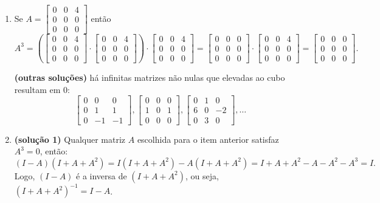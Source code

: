 \documentclass[12pt,a4paper]{article}
\begin{document}
\begin{ExerciseList}
\Answer
\begin{enumerate}
\item Se $A = \begin{bmatrix}
0 &0 &4\\
0 &0 &0\\
0 &0 &0
\end{bmatrix}$ então
\[
A^3 =\left(
\begin{bmatrix}
0 &0 &4\\
0 &0 &0\\
0 &0 &0
\end{bmatrix}
\cdot
\begin{bmatrix}
0 &0 &4\\
0 &0 &0\\
0 &0 &0
\end{bmatrix}\right)
\cdot
\begin{bmatrix}
0 &0 &4\\
0 &0 &0\\
0 &0 &0
\end{bmatrix}
=
\begin{bmatrix}
0 &0 &0\\
0 &0 &0\\
0 &0 &0
\end{bmatrix}
\cdot
\begin{bmatrix}
0 &0 &4\\
0 &0 &0\\
0 &0 &0
\end{bmatrix}
=
\begin{bmatrix}
0 &0 &0\\
0 &0 &0\\
0 &0 &0
\end{bmatrix}.
\]

\textbf{(outras soluções)} há infinitas matrizes não nulas que elevadas ao cubo resultam em $0$:
\[
\begin{bmatrix}
0 & 0 & 0\\
0 & 1 & 1\\
0 &-1 &-1
\end{bmatrix},
\begin{bmatrix}
0 & 0 & 0\\
1 & 0 & 1\\
0 & 0 & 0
\end{bmatrix},
\begin{bmatrix}
0 & 1 & 0\\
6 & 0 & -2\\
0 & 3 & 0
\end{bmatrix},
\ldots
\]

\item \textbf{(solução 1)} Qualquer matriz $A$ escolhida para o item anterior satisfaz $A^3=0$, então:
\[
(I - A)(I + A + A^2)
= I(I + A + A^2)
 -A(I + A + A^2)
= I + A + A^2
 -A - A^2 - A^3
= I.
\]
Logo, $(I - A)$ é a inversa de $(I + A + A^2)$, ou seja, $(I + A + A^2)^{-1} = I - A$.


\end{enumerate}
\end{ExerciseList}
\end{document}
